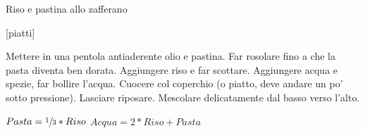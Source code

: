 \begin{recipe}[label=risoJawad]{Riso e pastina allo zafferano}
    \begin{header}
        [piatti]

    \end{header}

    \begin{ingredients}
    \end{ingredients}

    \begin{preparation}
        \step Mettere in una pentola antiaderente olio e pastina.
        \step Far rosolare fino a che la pasta diventa ben dorata.
        \step Aggiungere riso e far scottare.
        \step Aggiungere acqua e spezie, far bollire l'acqua.
        \step Cuocere col coperchio (o piatto, deve andare un po' sotto pressione).
        \step Lasciare riposare.
        \step Mescolare delicatamente dal basso verso l'alto.
    \end{preparation}

    \begin{suggestion}
        \suggestionMark $Pasta = \sfrac{1}{3} * Riso$
        \suggestionMark $Acqua = 2 * Riso + Pasta$
    \end{suggestion}
\end{recipe}
